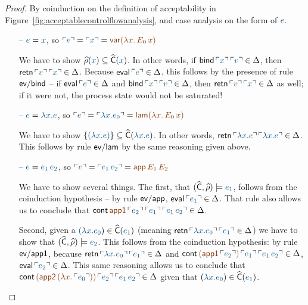 \begin{proof}
  By coinduction on the definition of acceptability in
  Figure~\ref{fig:acceptablecontrolflowanalysis}, and case analysis on 
  the form of $\obj{e}$. 

  \begin{itemize}
  \item[--] $\obj{e} = \obj{x}$, 
  so $\interp{e} = \interp{x} = \lf{{\sf var}(\lambda x.\,E_0\,x)}$

  We have to show $\widehat{\rho}(\obj{x}) \subseteq \widehat{\sf
    C}(\obj{x})$. In other words, if ${\sf
    bind}\,\interp{x}\,\interp{v} \in \Delta$, then ${\sf
    retn}\,\interp{v}\,\interp{x} \in \Delta$. Because ${\sf
    eval}\,\interp{e} \in \Delta$, this follows by the presence of
  rule ${\sf ev/bind}$ -- if ${\sf eval}\,\interp{e} \in \Delta$ and
  ${\sf bind}\,\interp{x}\,\interp{v} \in \Delta$, then ${\sf
    retn}\,\interp{v}\,\interp{x} \in \Delta$ as well; if it were not,
  the process state would not be saturated!

  \bigskip

  \item[--] $\obj e = \obj{\lambda x.e}$, so 
   $\interp{e} = \interp{\lambda x.e_0} = \lf{{\sf lam}(\lambda x.\,E_0\,x)}$

    We have to show $\{ \obj{(\lambda x.e)} \} \subseteq \widehat{\sf
      C}(\obj{\lambda x.e})$. In other words,
    ${\sf retn}\,\interp{\lambda x.e}\,\interp{\lambda x.e} \in
    \Delta$. This follows by rule ${\sf ev/lam}$ by the same reasoning given 
   above. 
  
  \bigskip  

  \item[--] $\obj{e} = \obj{e_1\,e_2}$, so 
  $\interp{e} = \interp{e_1\,e_2} = \lf{{\sf app}\,E_1\,E_2}$
 
  We have to show several things. The first, that $(\widehat{\sf C},
  \widehat{\rho}) \models \obj{e_1}$, follows from the coinduction
  hypothesis -- by rule ${\sf ev/app}$, ${\sf eval}\,\interp{e_1} \in
  \Delta$. That rule also allows us to conclude that ${\sf
    cont}\,\lf{{\sf app1}\,\interp{e_2}}\,\interp{e_1}\,\interp{e_1\,e_2} \in
  \Delta$.

  \medskip Second, given a $\obj{(\lambda x.e_0}) \in \widehat{\sf
    C}(\obj{e_1})$ (meaning ${\sf retn}\,\interp{\lambda
    x.e_0}\,\interp{e_1} \in \Delta$) we have to show that
  $(\widehat{\sf C}, \widehat{\rho}) \models \obj{e_2}$. This follows
  from the coinduction hypothesis: by rule ${\sf ev/app1}$, because
  ${\sf retn}\,\interp{\lambda x.e_0}\,\interp{e_1} \in \Delta$ and
  ${\sf cont}\,\lf{({\sf
      app1}\,\interp{e_2})}\,\interp{e_1}\,\interp{e_1\,e_2} \in \Delta$,
  ${\sf eval}\,\interp{e_2} \in \Delta$. This same reasoning allows us
  to conclude that ${\sf cont}\,\lf{({\sf app2}\,(\lf \lambda
    x.\,\interp{e_0}))}\,\interp{e_2}\,\interp{e_1\,e_2} \in \Delta$ given
  that $(\obj{\lambda x.e_0}) \in \widehat{\sf
    C}(\obj{e_1})$. 


\end{itemize}
\end{proof}
